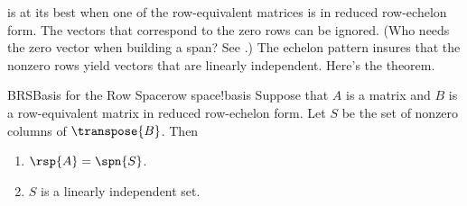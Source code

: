 %
 is at its best when one of the row-equivalent matrices is in reduced row-echelon form.  The vectors that correspond to the zero rows can be ignored. (Who needs the zero vector when building a span? See .)  The echelon pattern insures that the nonzero rows yield vectors that are linearly independent.  Here's the theorem.
%
\begin{theorem}{BRS}{Basis for the Row Space}{row space!basis}
Suppose that $A$ is a matrix and $B$ is a row-equivalent matrix in reduced row-echelon form.  Let $S$ be the set of nonzero columns of $\transpose{B}$.  Then
%
\begin{enumerate}
\item $\rsp{A}=\spn{S}$.
\item $S$ is a linearly independent set.
\end{enumerate}
%
\end{theorem}
%
